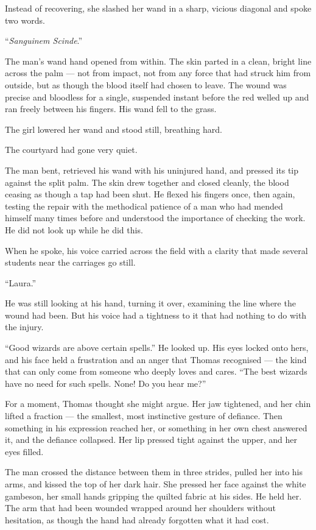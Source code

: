 Instead of recovering, she slashed her wand in a sharp, vicious diagonal and spoke two words.

\enquote{\textit{Sanguinem Scinde}.}

The man's wand hand opened from within. The skin parted in a clean, bright line across the palm --- not from impact, not from any force that had struck him from outside, but as though the blood itself had chosen to leave. The wound was precise and bloodless for a single, suspended instant before the red welled up and ran freely between his fingers. His wand fell to the grass.

The girl lowered her wand and stood still, breathing hard.

The courtyard had gone very quiet.

The man bent, retrieved his wand with his uninjured hand, and pressed its tip against the split palm. The skin drew together and closed cleanly, the blood ceasing as though a tap had been shut. He flexed his fingers once, then again, testing the repair with the methodical patience of a man who had mended himself many times before and understood the importance of checking the work. He did not look up while he did this.

When he spoke, his voice carried across the field with a clarity that made several students near the carriages go still.

\enquote{Laura.}

He was still looking at his hand, turning it over, examining the line where the wound had been. But his voice had a tightness to it that had nothing to do with the injury.

\enquote{Good wizards are above certain spells.} He looked up. His eyes locked onto hers, and his face held a frustration and an anger that Thomas recognised --- the kind that can only come from someone who deeply loves and cares. \enquote{The best wizards have no need for such spells. None! Do you hear me?}

For a moment, Thomas thought she might argue. Her jaw tightened, and her chin lifted a fraction --- the smallest, most instinctive gesture of defiance. Then something in his expression reached her, or something in her own chest answered it, and the defiance collapsed. Her lip pressed tight against the upper, and her eyes filled.

The man crossed the distance between them in three strides, pulled her into his arms, and kissed the top of her dark hair. She pressed her face against the white gambeson, her small hands gripping the quilted fabric at his sides. He held her. The arm that had been wounded wrapped around her shoulders without hesitation, as though the hand had already forgotten what it had cost.

